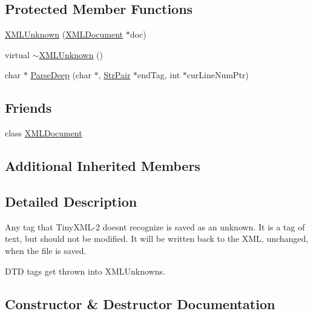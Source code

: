 \subsection*{Protected Member Functions}
\begin{DoxyCompactItemize}
\item 
\hyperlink{classtinyxml2_1_1_x_m_l_unknown_a9391eb679598d50baba424e6f1aa367b}{X\+M\+L\+Unknown} (\hyperlink{classtinyxml2_1_1_x_m_l_document}{X\+M\+L\+Document} $\ast$doc)
\item 
virtual \hyperlink{classtinyxml2_1_1_x_m_l_unknown_a86fcd722ca173a7f385bafafa879f26e}{$\sim$\+X\+M\+L\+Unknown} ()
\item 
char $\ast$ \hyperlink{classtinyxml2_1_1_x_m_l_unknown_a1101aca8aad424c131e34eb4f1289592}{Parse\+Deep} (char $\ast$, \hyperlink{classtinyxml2_1_1_str_pair}{Str\+Pair} $\ast$end\+Tag, int $\ast$cur\+Line\+Num\+Ptr)
\end{DoxyCompactItemize}
\subsection*{Friends}
\begin{DoxyCompactItemize}
\item 
class \hyperlink{classtinyxml2_1_1_x_m_l_unknown_a4eee3bda60c60a30e4e8cd4ea91c4c6e}{X\+M\+L\+Document}
\end{DoxyCompactItemize}
\subsection*{Additional Inherited Members}


\subsection{Detailed Description}
Any tag that Tiny\+X\+M\+L-\/2 doesn\textquotesingle{}t recognize is saved as an unknown. It is a tag of text, but should not be modified. It will be written back to the X\+ML, unchanged, when the file is saved.

D\+TD tags get thrown into X\+M\+L\+Unknowns. 

\subsection{Constructor \& Destructor Documentation}
\mbox{\label{classtinyxml2_1_1_x_m_l_unknown_a9391eb679598d50baba424e6f1aa367b}} 
